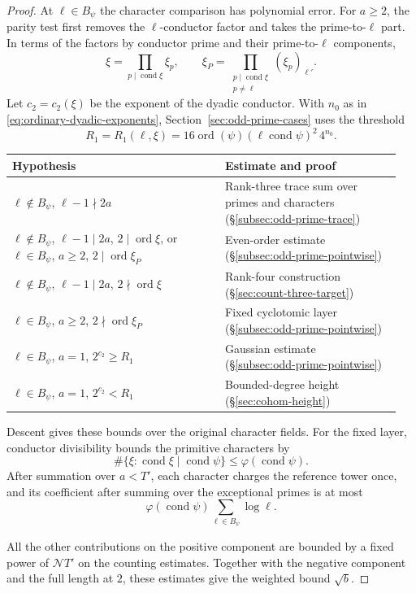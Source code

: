\begin{proof}
At \(\ell\in B_\psi\) the character comparison has polynomial error. For \(a\ge2\), the parity test first removes the \(\ell\)-conductor factor and takes the prime-to-\(\ell\) part. In terms of the factors by conductor prime and their prime-to-\(\ell\) components,
\[
 \xi=\prod_{p\mid\operatorname{cond}\xi}\xi_p,\qquad
 \xi_P=\prod_{\substack{p\mid\operatorname{cond}\xi\\p\ne\ell}}(\xi_p)_{\ell'} .
\]
Let \(c_2=c_2(\xi)\) be the exponent of the dyadic conductor. With \(n_0\) as in \eqref{eq:ordinary-dyadic-exponents}, Section~\ref{sec:odd-prime-cases} uses the threshold
\[
 R_1=R_1(\ell,\xi)=16\operatorname{ord}(\psi)
            (\ell\operatorname{cond}\psi)^2\,4^{n_0}.
\]
\begin{center}
\begin{tabular}{@{}p{0.52\linewidth}p{0.43\linewidth}@{}}
Hypothesis & Estimate and proof \\
\hline
\(\ell\notin B_\psi\), \(\ell-1\nmid2a\) &
  Rank-three trace sum over primes and characters (\S\ref{subsec:odd-prime-trace}) \\
\(\ell\notin B_\psi\), \(\ell-1\mid2a\), \(2\mid\operatorname{ord}\xi\), or
\(\ell\in B_\psi\), \(a\ge2\), \(2\mid\operatorname{ord}\xi_P\) &
  Even-order estimate (\S\ref{subsec:odd-prime-pointwise}) \\
\(\ell\notin B_\psi\), \(\ell-1\mid2a\), \(2\nmid\operatorname{ord}\xi\) &
  Rank-four construction (\S\ref{sec:count-three-target}) \\
\(\ell\in B_\psi\), \(a\ge2\), \(2\nmid\operatorname{ord}\xi_P\) &
  Fixed cyclotomic layer (\S\ref{subsec:odd-prime-pointwise}) \\
\(\ell\in B_\psi\), \(a=1\), \(2^{c_2}\ge R_1\) &
  Gaussian estimate (\S\ref{subsec:odd-prime-pointwise}) \\
\(\ell\in B_\psi\), \(a=1\), \(2^{c_2}<R_1\) &
  Bounded-degree height (\S\ref{sec:cohom-height})
\end{tabular}
\end{center}
Descent gives these bounds over the original character fields. \label{cor:family-window-2}
For the fixed layer, conductor divisibility bounds the primitive characters by
\[
 \#\{\xi:\operatorname{cond}\xi\mid\operatorname{cond}\psi\}
 \le\varphi(\operatorname{cond}\psi).
\]
After summation over \(a<T'\), each character charges the reference tower once,
and its coefficient after summing over the exceptional primes
is at most
\[
 \varphi(\operatorname{cond}\psi) \sum_{\ell\in B_\psi}\log\ell.
\]

All the other contributions on the positive component are bounded by a
fixed power of \(\mathcal NT'\) on the counting estimates.
Together with the negative component and the full length at
\(2\), these estimates give the weighted bound \(\sqrt b\).
\end{proof}


